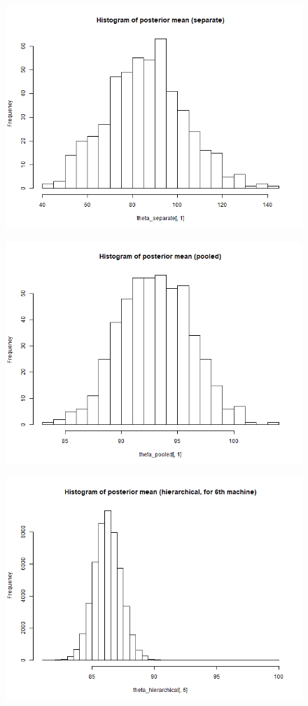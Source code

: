 \documentclass{article}
\begin{document}
{{        \begin{figure}[H]
            \centering
            \includegraphics[width = 0.8\linewidth]{posterior_mean_separate.png}
            \caption{}
        \end{figure}
        \begin{figure}[H]
            \centering
            \includegraphics[width = 0.8\linewidth]{posterior_mean_pooled.png}
            \caption{}
        \end{figure}
        \begin{figure}[H]
            \centering
            \includegraphics[width = 0.8\linewidth]{posterior_mean_hierarchical.png}

\end{figure}}}
\end{document}
